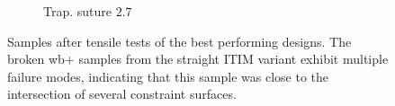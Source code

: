 \begin{figure}
\begin{subfigure}[B]{.22\columnwidth}
		\caption{Trap. suture $2.7$}
		\label{interlocking:fig:failures_suture}
	\end{subfigure}
	\caption{Samples after tensile tests of the best performing designs.
		The broken wb+ samples from the straight ITIM variant exhibit multiple failure modes, indicating that this sample was close to the intersection of several constraint surfaces.}
	\label{interlocking:fig:failures}
\end{figure}






